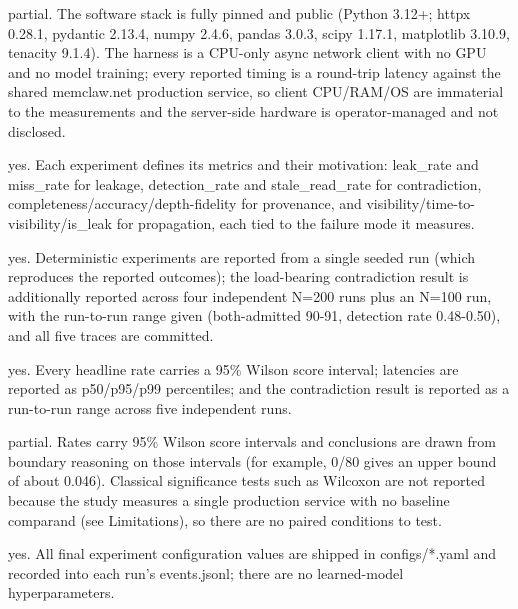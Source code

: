 \documentclass[letterpaper]{article}
\begin{document}
\begin{itemize}
\begin{itemize}
    partial. The software stack is fully pinned and public (Python 3.12+; httpx 0.28.1, pydantic 2.13.4, numpy 2.4.6, pandas 3.0.3, scipy 1.17.1, matplotlib 3.10.9, tenacity 9.1.4). The harness is a CPU-only async network client with no GPU and no model training; every reported timing is a round-trip latency against the shared memclaw.net production service, so client CPU/RAM/OS are immaterial to the measurements and the server-side hardware is operator-managed and not disclosed.

    yes. Each experiment defines its metrics and their motivation: leak\_rate and miss\_rate for leakage, detection\_rate and stale\_read\_rate for contradiction, completeness/accuracy/depth-fidelity for provenance, and visibility/time-to-visibility/is\_leak for propagation, each tied to the failure mode it measures.

    yes. Deterministic experiments are reported from a single seeded run (which reproduces the reported outcomes); the load-bearing contradiction result is additionally reported across four independent N=200 runs plus an N=100 run, with the run-to-run range given (both-admitted 90-91, detection rate 0.48-0.50), and all five traces are committed.

    yes. Every headline rate carries a 95\% Wilson score interval; latencies are reported as p50/p95/p99 percentiles; and the contradiction result is reported as a run-to-run range across five independent runs.

    partial. Rates carry 95\% Wilson score intervals and conclusions are drawn from boundary reasoning on those intervals (for example, 0/80 gives an upper bound of about 0.046). Classical significance tests such as Wilcoxon are not reported because the study measures a single production service with no baseline comparand (see Limitations), so there are no paired conditions to test.

    yes. All final experiment configuration values are shipped in configs/*.yaml and recorded into each run's events.jsonl; there are no learned-model hyperparameters.


\end{itemize}
\end{itemize}
\ifreproStandalone
\end{document}
